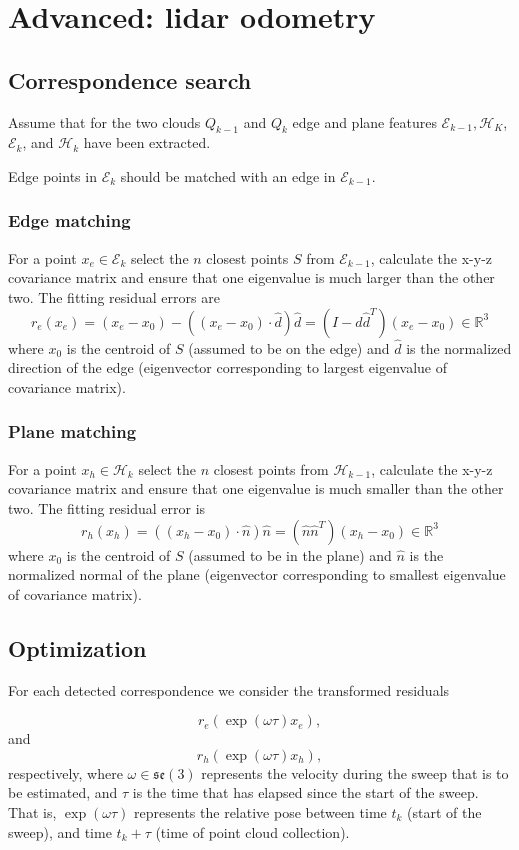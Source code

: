 
\chapter{Advanced: lidar odometry}

\section{Correspondence search}

Assume that for the two clouds $Q_{k-1}$ and $Q_k$ edge and plane features $\mathcal E_{k-1}, \mathcal H_K$, $\mathcal E_{k}$, and  $\mathcal H_k$ have been extracted.

Edge points in $\mathcal E_k$ should be matched with an edge in $\mathcal E_{k-1}$. 

\subsection{Edge matching}
For a point $x_e \in \mathcal E_k$ select the $n$ closest points $S$ from $\mathcal E_{k-1}$, calculate the x-y-z covariance matrix and ensure that one eigenvalue is much larger than the other two. The fitting residual errors are
$$
  r_e(x_e) = (x_e - x_0) - ((x_e - x_0) \cdot \hat d) \hat d = (I - \hat d \hat d^T) (x_e - x_0)  \in \mathbb{R}^3
$$
where $x_0$ is the centroid of $S$ (assumed to be on the edge) and $\hat d$ is the normalized direction of the edge (eigenvector corresponding to largest eigenvalue of covariance matrix).


\subsection{Plane matching}

For a point $x_h \in \mathcal H_k$ select the $n$ closest points from $\mathcal H_{k-1}$, calculate the x-y-z covariance matrix and ensure that one eigenvalue is much smaller than the other two. The fitting residual error is
$$
  r_h(x_h) = \left((x_h - x_0) \cdot \hat n \right) \hat n = (\hat n \hat n^T) \left( x_h - x_0 \right) \in \mathbb{R}^3
$$
where $x_0$ is the centroid of $S$ (assumed to be in the plane) and $\hat n$ is the normalized normal of the plane (eigenvector corresponding to smallest eigenvalue of covariance matrix).


\section{Optimization}

For each detected correspondence we consider the transformed residuals

$$
  r_e( \exp( \omega \tau ) x_e ),
$$
and 
$$
  r_h ( \exp( \omega \tau ) x_h ),
$$
respectively, where $\omega \in \mathfrak{se}(3)$ represents the velocity during the sweep that is to be estimated, and $\tau$ is the time that has elapsed since the start of the sweep. That is,
$\exp(\omega \tau)$ represents the relative pose between time $t_k$ (start of the sweep), and time $t_k + \tau$ (time of point cloud collection).
